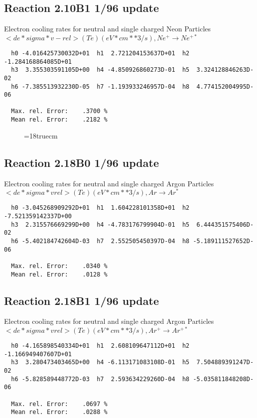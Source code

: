 \subsection{
Reaction 2.10B1                   1/96 update
}

  Electron cooling rates for neutral and single
  charged Neon Particles
 $ <de*sigma*v-rel>(Te)  (eV*cm**3/s), Ne^+ \rightarrow Ne^{+*} $

\begin{verbatim}
  h0 -4.016425730032D+01  h1  2.721204153637D+01  h2 -1.284168864085D+01
  h3  3.355303591105D+00  h4 -4.850926860273D-01  h5  3.324128846263D-02
  h6 -7.385513932230D-05  h7 -1.193933246957D-04  h8  4.774152004995D-06

  Max. rel. Error:    .3700 %
  Mean rel. Error:    .2182 %

\end{verbatim}

\begin{figure} \label{2.10l}
\epsfxsize=18truecm
\end{figure}
\newpage

\subsection{
Reaction 2.18B0                   1/96 update
}

  Electron cooling rates for neutral and single
  charged Argon Particles
 $<de*sigma*vrel>(Te)  (eV*cm**3/s), Ar  \rightarrow Ar^* $

\begin{verbatim}
  h0 -3.045268909292D+01  h1  1.604228101358D+01  h2 -7.521359142337D+00
  h3  2.315576669299D+00  h4 -4.783176799904D-01  h5  6.444351575406D-02
  h6 -5.402184742604D-03  h7  2.552505450397D-04  h8 -5.189111527652D-06

  Max. rel. Error:    .0340 %
  Mean rel. Error:    .0128 %

\end{verbatim}


\subsection{
Reaction 2.18B1                   1/96 update
}

  Electron cooling rates for neutral and single
  charged Argon Particles
 $ <de*sigma*vrel>(Te)  (eV*cm**3/s), Ar^+ \rightarrow Ar^{+*} $

\begin{verbatim}
  h0 -4.165898540334D+01  h1  2.608109647112D+01  h2 -1.166949407607D+01
  h3  3.280473403465D+00  h4 -6.113171083108D-01  h5  7.504889391247D-02
  h6 -5.828589448772D-03  h7  2.593634229260D-04  h8 -5.035811848208D-06

  Max. rel. Error:    .0697 %
  Mean rel. Error:    .0288 %

\end{verbatim}


